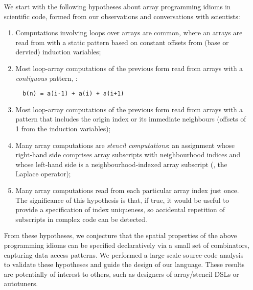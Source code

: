 
\noindent
We start with the following hypotheses about array programming idioms
in scientific code, formed from our observations and conversations
with scientists:
\begin{enumerate}[leftmargin=2em]
\item Computations involving loops over arrays are common, where an
  arrays are read from with a static pattern based on constant offsets
  from (base or dervied) induction variables;

\item Most loop-array computations of the previous form read from
  arrays with a \emph{contiguous} pattern, \eg{}:
%
\begin{verbatim}
  b(n) = a(i-1) + a(i) + a(i+1)
\end{verbatim}
%
\item Most loop-array computations of the previous form read from
  arrays with a pattern that includes the origin index or its
  immediate neighbours (offsets of 1 from the induction variables);

\item Many array computations are \emph{stencil computations}: an
  assignment whose right-hand side comprises array subscripts with
  neighbourhood indices and whose left-hand side is a
  neighbourhood-indexed array subscript (\eg{}, the Laplace operator);

\item Many array computations read from each particular array index just
  once. The significance of this hypothesis is that, if true, it would
  be useful to provide a specification of index uniqueness, so accidental
  repetition of subscripts in complex code can be detected.
\end{enumerate}
%
From these hypotheses, we conjecture that the spatial properties of
the above programming idioms can be specified declaratively via a
small set of combinators, capturing data access patterns.%
We performed a large scale source-code analysis to validate these
hypotheses and guide the design of our language. These results are
potentially of interest to others, such as designers of array/stencil DSLs
or autotuners.

